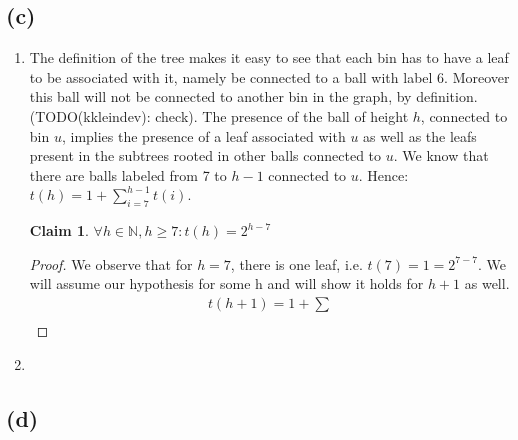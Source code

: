 \documentclass[a4paper,german]{article}
\newtheorem{claim}{Claim}
\begin{document}
\subsection*{(c)}
\begin{enumerate}[i]
	\item
	The definition of the tree makes it easy to see that each bin has to have a leaf to be associated with it, namely be connected to a ball with label 6. Moreover this ball will not be connected to another bin in the graph, by definition. (TODO(kkleindev): check). The presence of the ball of height \(h\), connected to bin \(u\), implies the presence of a leaf associated with \(u\) as well as the leafs present in the subtrees rooted in other balls connected to \(u\). We know that there are balls labeled from 7 to \(h -1\) connected to \(u\). Hence: \(t(h) = 1 + \sum_{i=7}^{h-1} t(i) \).
	\begin{claim} 
		\(\forall h \in \mathbb{N}, h \geq 7: t(h) = 2^{h-7}\)
	\end{claim}
	\begin{proof} 
		We observe that for \(h = 7\), there is one leaf, i.e. \(t(7) = 1 = 2 ^{7-7}.\) We will assume our hypothesis for some h and will show it holds for \(h+1\) as well.
		\begin{align*}
		t(h+1) = 1 + \sum \\
		\end{align*}
	\end{proof}
\item 
\end{enumerate}
\subsection*{(d)}
\end{document}
